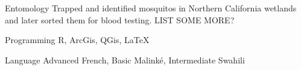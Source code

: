 

\begin{cvskills}

  \cvskill
    {Entomology} %
    {Trapped and identified mosquitos in Northern California wetlands and later sorted them for blood testing. LIST SOME MORE?} %

  \cvskill
    {Programming} %
    {R, ArcGis, QGis, LaTeX} %
    
  \cvskill
    {Language} %
    {Advanced French, Basic Malink\'e, Intermediate Swahili} %

\end{cvskills}
